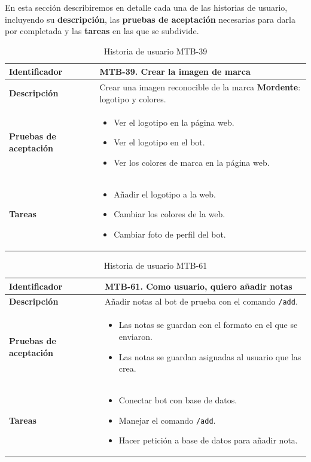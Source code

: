 En esta sección describiremos en detalle cada una de las historias de usuario, incluyendo su \textbf{descripción}, las \textbf{pruebas de aceptación} necesarias para darla por completada y las \textbf{tareas} en las que se subdivide.


\newcommand{\historia}[5]{
\begin{table}[H]
\setlength\extrarowheight{2pt} %
\begin{tabularx}{\textwidth}{| p{.20\textwidth} | p{.73\textwidth} |}
\hline
\textbf{Identificador} & #1. #2  \\ \hline
\textbf{Descripción} & #3  \\ \hline
\textbf{Pruebas de aceptación} & #4  \\ \hline
\textbf{Tareas} & #5  \\ \hline
\end{tabularx}
\caption{Historia de usuario #1}\label{tab:mtb#1}
\end{table}
}

\historia{MTB-39}{Crear la imagen de marca}{Crear una imagen reconocible de la marca \textbf{Mordente}: logotipo y colores.}{
\begin{itemize}
    \item Ver el logotipo en la página web.
    \item Ver el logotipo en el bot.
    \item Ver los colores de marca en la página web.
\end{itemize}
}{
\begin{itemize}
    \item Añadir el logotipo a la web.
    \item Cambiar los colores de la web.
    \item Cambiar foto de perfil del bot.
\end{itemize}
}

\historia{MTB-61}{Como usuario, quiero añadir notas}{
Añadir notas al bot de prueba con el comando \texttt{/add}.
}{
\begin{itemize}
    \item Las notas se guardan con el formato en el que se enviaron.
    \item Las notas se guardan asignadas al usuario que las crea.
\end{itemize}
}{
\begin{itemize}
    \item Conectar bot con base de datos.
    \item Manejar el comando \texttt{/add}.
    \item Hacer petición a base de datos para añadir nota.
\end{itemize}
}

